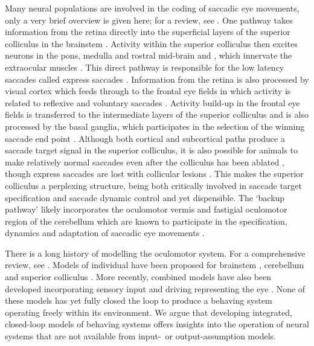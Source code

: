 \documentclass{frontiersSCNS}
\begin{document}
Many neural populations are involved in the coding of saccadic eye
movements, only a very brief overview is given here; for a review,
see \cite{munoz_commentary:_2002}. One pathway takes information from
the retina directly into the superficial layers of the superior
colliculus in the brainstem
\citep{sterling_receptive_1971,linden_massive_1983,wu_involvement_1994}.
Activity within the superior colliculus then excites neurons in the
pons, medulla and rostral mid-brain \citep{sparks_brainstem_2002}
and , which innervate the extraocular
muscles
\citep{fuchs_firing_1970,sparks_brainstem_2002}. This direct pathway
is responsible for the low latency saccades called express saccades
\citep{schiller_effect_1987,edelman_activity_1996}.
%
Information from the retina is also processed by visual cortex which
feeds through to the frontal eye fields in which activity is related
to reflexive and voluntary
saccades \citep{schall_neural_1999}. Activity build-up in the frontal
eye fields is transferred to the intermediate layers of the superior
colliculus
\citep{stanton_frontal_1988-1} and is also processed by the basal ganglia,
which participates in the selection of the winning saccade end point
\citep{stanton_frontal_1988,hikosaka_role_2000}.
%
Although both cortical and subcortical paths produce a saccade target
signal in the superior colliculus, it is also possible for animals to
make relatively normal saccades even after the colliculus has been
ablated
\citep{wurtz_activity_1972,aizawa_reversible_1998},
though express saccades are lost with collicular lesions
\citep{schiller_effect_1987}. This makes the superior colliculus
a perplexing structure, being both critically involved in saccade
target specification \citep{sparks_sensory_1987} and saccade dynamic control
\citep{waitzman_superior_1991,goossens_optimal_2012} and yet dispensible.
The `backup pathway' likely incorporates the oculomotor vermis and
fastigial oculomotor region of the cerebellum which are known to
participate in the specification, dynamics and adaptation of saccadic
eye movements \citep{kleine_saccade-related_2003,takagi_effects_1998}.

There is a long history of modelling the oculomotor system. For a
comprehensive review, see \cite{girard_brainstem_2005}. Models of
individual  have been proposed for brainstem
\citep{robinson_oculomotor_1975,scudder_new_1988,gancarz_neural_1998},
cerebellum \citep{quaia_model_1999,dean_modelling_1995,dean_learning_1994}
and superior colliculus
\citep{massone_neural-network_1994,arai_two-dimensional_1994,moren_mechanism_2013,marino_spatial_2012}.
More recently, combined models have also been developed incorporating
sensory input \citep{cope_basal_2017} and driving  representing the eye
\citep{tabareau_geometry_2007,nguyen_saccade_2014,thurat_biomimetic_2015}.
None of these models has yet fully closed the loop to produce a
behaving system operating freely within its environment. We argue that
developing integrated, closed-loop models of behaving systems offers
insights into the operation of neural systems that are not available
from input-~or output-assumption models.
\end{document}

